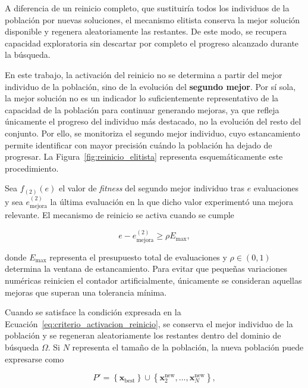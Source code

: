 A diferencia de un reinicio completo, que sustituiría todos los individuos
de la población por nuevas soluciones, el mecanismo elitista conserva la
mejor solución disponible y regenera aleatoriamente las restantes. De este
modo, se recupera capacidad exploratoria sin descartar por completo el
progreso alcanzado durante la búsqueda.

En este trabajo, la activación del reinicio no se determina a partir del mejor individuo de la población, sino de la evolución del \textbf{segundo mejor}. Por sí sola, la mejor solución no es un indicador lo suficientemente representativo de la capacidad de la población para continuar generando mejoras, ya que refleja únicamente el progreso del individuo más destacado, no la evolución del resto del conjunto. Por ello, se monitoriza el segundo mejor individuo, cuyo estancamiento permite identificar con mayor precisión cuándo la población ha dejado de progresar. La Figura~\ref{fig:reinicio_elitista} representa esquemáticamente este procedimiento.



Sea \(f_{(2)}(e)\) el valor de \textit{fitness} del segundo mejor individuo tras \(e\) evaluaciones y sea \(e_{\text{mejora}}^{(2)}\) la última evaluación en la que dicho valor experimentó una mejora relevante. El mecanismo de reinicio se activa cuando se cumple

\begin{equation}
    e - e_{\text{mejora}}^{(2)}
    \geq
    \rho E_{\max},
    \label{eq:criterio_activacion_reinicio}
\end{equation}

donde \(E_{\max}\) representa el presupuesto total de evaluaciones y
\(\rho \in (0,1)\) determina la ventana de estancamiento. Para evitar que pequeñas variaciones numéricas reinicien el contador artificialmente, únicamente se consideran aquellas mejoras que superan una tolerancia mínima.

Cuando se satisface la condición expresada en la Ecuación~\ref{eq:criterio_activacion_reinicio}, se conserva el mejor individuo de la población y se regeneran aleatoriamente los restantes dentro del dominio de búsqueda \(\Omega\). Si \(N\) representa el tamaño de la población, la nueva población puede expresarse como

\begin{equation}
    P'
    =
    \left\{
    \mathbf{x}_{\text{best}}
    \right\}
    \cup
    \left\{
    \mathbf{x}^{\text{new}}_2,
    \dots,
    \mathbf{x}^{\text{new}}_N
    \right\},
    \label{eq:poblacion_tras_reinicio}
\end{equation}

